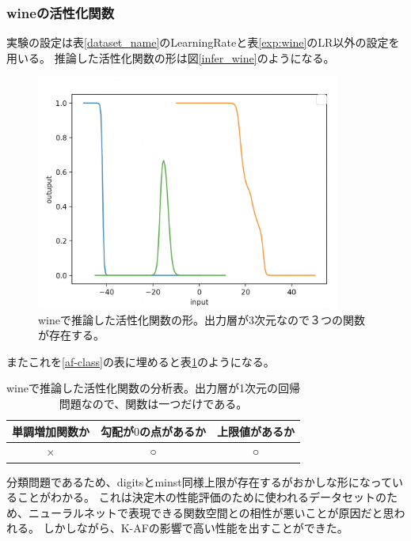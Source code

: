 \subsubsection{wineの活性化関数}
実験の設定は表\ref{dataset_name}のLearningRateと表\ref{exp:wine}のLR以外の設定を用いる。
推論した活性化関数の形は図\ref{infer_wine}のようになる。
\begin{figure}[hbtp]
    \begin{center}
        \includegraphics[width=10cm]{asset/wine-0.01.png}
            \caption{wineで推論した活性化関数の形。出力層が3次元なので３つの関数が存在する。}
            \label{ifer_wine}
    \end{center}
\end{figure}

またこれを\ref{af-class}の表に埋めると表\ref{anal_wine}のようになる。
\begin{table}[htbp]
    \begin{center}
        \caption{wineで推論した活性化関数の分析表。出力層が1次元の回帰問題なので、関数は一つだけである。}
        \label{anal_wine}
        \vspace{2mm} 
        \begin{tabular}{ |c|c|c| }
        単調増加関数か & 勾配が$ 0 $の点があるか & 上限値があるか   \\
        \hline
        × & ○ & ○   \\
        \end{tabular}
    \end{center}
\end{table}


分類問題であるため、digitsとminst同様上限が存在するがおかしな形になっていることがわかる。
これは決定木の性能評価のために使われるデータセットのため、ニューラルネットで表現できる関数空間との相性が悪いことが原因だと思われる。
しかしながら、K-AFの影響で高い性能を出すことができた。






